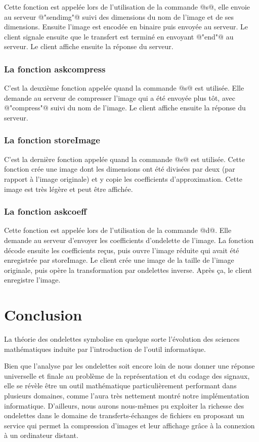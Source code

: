 \documentclass{article}
\begin{document}
Cette fonction est appelée lors de l'utilisation de la commande @s@, elle envoie au serveur @"sendimg"@ suivi des dimensions du nom de l'image et de ses dimensions. Ensuite l'image est encodée en binaire puis envoyée au serveur. Le client signale ensuite que le transfert est terminé en envoyant @"end"@ au serveur. Le client affiche ensuite la réponse du serveur.

\subsubsection{La fonction askcompress}

C'est la deuxième fonction appelée quand la commande @s@ est utilisée. Elle demande au serveur de compresser l'image qui a été envoyée plus tôt, avec @"compress"@ suivi du nom de l'image. Le client affiche ensuite la réponse du serveur.

\subsubsection{La fonction storeImage}

C'est la dernière fonction appelée quand la commande @s@ est utilisée. Cette fonction crée une image dont les dimensions ont été divisées par deux (par rapport à l'image originale) et y copie les coefficients d'approximation. Cette image est très légère et peut être affichée.

\subsubsection{La fonction askcoeff}

Cette fonction est appelée lors de l'utilisation de la commande @d@. Elle demande au serveur d'envoyer les coefficients d'ondelette de l'image. La fonction décode ensuite les coefficients reçus, puis ouvre l'image réduite qui avait été enregistrée par storeImage. Le client crée une image de la taille de l'image originale, puis opère la transformation par ondelettes inverse. Après ça, le client enregistre l'image.


\section{Conclusion}


La théorie des ondelettes symbolise en quelque sorte l'évolution des sciences mathématiques induite par l'introduction de l'outil informatique.
 
Bien que l'analyse par les ondelettes soit encore loin de nous donner une réponse universelle et finale au problème de la représentation et du codage des signaux, elle se révèle être un outil mathématique particulièrement performant dans plusieurs domaines, comme l'aura très nettement montré notre implémentation informatique.
D'ailleurs, nous aurons nous-mêmes pu exploiter la richesse des ondelettes dans le domaine de transferts-échanges de fichiers en proposant un service qui permet la compression d'images et leur affichage grâce à la connexion à un ordinateur distant.
\end{document}
